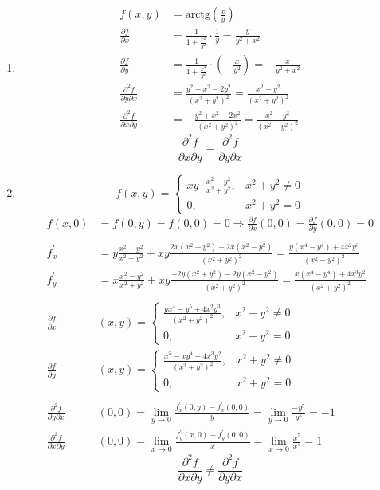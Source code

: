 \documentclass[a4paper,12pt]{article} %
\begin{document}
\begin{enumerate}

    \item 
	\begin{align*}
		f(x, y) &= \text{arctg}\left(\frac{x}{y}\right)\\
		\frac{\partial{f}}{\partial{x}} &= \frac{1}{1+\frac{x^2}{y^2}}\cdot\frac{1}{y} = \frac{y}{y^2+x^2}\\
		\frac{\partial{f}}{\partial{y}} &= \frac{1}{1+\frac{x^2}{y^2}}\cdot\left(-\frac{x}{y^2}\right) = -\frac{x}{y^2+x^2}\\
		\frac{\partial^2f}{\partial{y}\partial{x}} &= \frac{y^2+x^2-2y^2}{(x^2+y^2)^2} = \frac{x^2-y^2}{(x^2+y^2)^2}\\
		\frac{\partial^2f}{\partial{x}\partial{y}} &= -\frac{y^2+x^2-2x^2}{(x^2+y^2)^2} = \frac{x^2-y^2}{(x^2+y^2)^2}
	\end{align*}
	\[
		\frac{\partial^2f}{\partial{x}\partial{y}} = \frac{\partial^2f}{\partial{y}\partial{x}}
	\]
	
	\item 
	\vspace{10mm}
	$$ f(x, y) = 
	\begin{cases*} 
		xy\cdot\frac{x^2-y^2}{x^2+y^2},& \text{$x^2+y^2\neq 0$}\\
		0,& \text{$x^2+y^2= 0$}
	\end{cases*}$$
    \begin{align*}
	f(x, 0) &= f(0, y) = f(0, 0) = 0 \Rightarrow \frac{\partial f}{\partial x}(0, 0) = \frac{\partial f}{\partial y}(0, 0) = 0\\&\\
	f^{'}_{x} &= y\frac{x^2-y^2}{x^2+y^2}+xy\frac{2x(x^2+y^2) - 2x(x^2-y^2)}{(x^2+y^2)^2} = \frac{y(x^4-y^4)+4x^2y^3}{(x^2+y^2)^2}\\
	f^{'}_{y} &= x\frac{x^2-y^2}{x^2+y^2}+xy\frac{-2y(x^2+y^2) - 2y(x^2-y^2)}{(x^2+y^2)^2} = \frac{x(x^4-y^4)+4x^3y^2}{(x^2+y^2)^2}\\&\\
	\frac{\partial f}{\partial x}&(x, y) =
	\begin{cases*}
		\frac{yx^4-y^5+4x^2y^3}{(x^2+y^2)^2}, &\text{$x^2+y^2\neq 0$}\\
		0, &\text{$x^2+y^2=0$}
	\end{cases*}\\
	\frac{\partial f}{\partial y}&(x, y) =
	\begin{cases*}
	\frac{x^5-xy^4-4x^3y^2}{(x^2+y^2)^2}, &\text{$x^2+y^2\neq 0$}\\
	0, &\text{$x^2+y^2=0$}
	\end{cases*}\\&\\
	\frac{\partial^2f}{\partial y\partial x}&(0, 0) = \lim\limits_{y\to 0}\frac{f^{'}_x(0, y) - f^{'}_x(0, 0)}{y} = \lim\limits_{y\to 0}\frac{-y^5}{y^5} = -1\\
	\frac{\partial^2f}{\partial x\partial y}&(0, 0) = \lim\limits_{x\to 0}\frac{f^{'}_y(x, 0) - f^{'}_y(0, 0)}{x} = \lim\limits_{x\to 0}\frac{x^5}{x^5} = 1
	\end{align*}
	\[
	\frac{\partial^2f}{\partial{x}\partial{y}} \neq \frac{\partial^2f}{\partial{y}\partial{x}}
	\]
	\vspace{5mm}


\end{enumerate}
\end{document}
